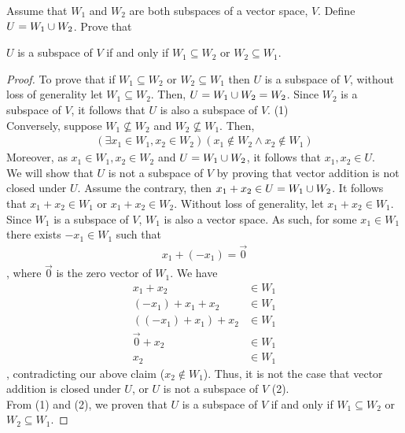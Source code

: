 \begin{question}\label{que:SubspaceUnion}
	\normalfont
	
	Assume that $W_1$ and $W_2$ are both subspaces of a vector space, $V$.  Define $U=W_1\cup W_2$.  Prove that 
	\begin{center}
		$U$ is a subspace of $V$ if and only if $W_1\subseteq W_2$ or $W_2\subseteq W_1$.  
	\end{center}
	
\end{question}
\renewcommand{\qedsymbol}{$\blacksquare$}
\begin{proof}
    To prove that if $W_1\subseteq W_2$ or $W_2\subseteq W_1$ then $U$ is a subspace of $V$, without loss of generality let $W_1\subseteq W_2$. Then, $U=W_1\cup W_2=W_2$. Since $W_2$ is a subspace of $V$, it follows that $U$ is also a subspace of $V$. (1)\\
    Conversely, suppose $W_1\not\subseteq W_2$ and $W_2\not\subseteq W_1$. Then, 
    \[
        \begin{aligned}
            (\exists x_1\in W_1, x_2\in W_2)(x_1\not\in W_2\land x_2\not\in W_1)
        \end{aligned}
    \]Moreover, as $x_1\in W_1, x_2\in W_2$ and $U=W_1\cup W_2$, it follows that $x_1,x_2\in U$.\\
    We will show that $U$ is not a subspace of $V$ by proving that vector addition is not closed under $U$. Assume the contrary, then $x_1+x_2\in U=W_1\cup W_2$. It follows that $x_1+x_2\in W_1$ or $x_1+x_2\in W_2$. Without loss of generality, let $x_1+x_2\in W_1$. Since $W_1$ is a subspace of $V$, $W_1$ is also a vector space. As such, for some $x_1\in W_1$ there exists $-x_1\in W_1$ such that 
    \[
        \begin{aligned}
            x_1+(-x_1)=\vec{0}
        \end{aligned}
    \], where $\vec{0}$ is the zero vector of $W_1.$ We have 
    \[
        \begin{aligned}
            x_1+x_2          &\in W_1\\
            (-x_1)+x_1+x_2   &\in W_1\\
            ((-x_1)+x_1)+x_2 &\in W_1\\
            \vec{0}+x_2      &\in W_1\\
            x_2              &\in W_1
        \end{aligned}
    \], contradicting our above claim ($x_2\not\in W_1$). Thus, it is not the case that vector addition is closed under $U$, or $U$ is not a subspace of $V$ (2).\\ 
    From (1) and (2), we proven that $U$ is a subspace of $V$ if and only if $W_1\subseteq W_2$ or $W_2\subseteq W_1$.
\end{proof}